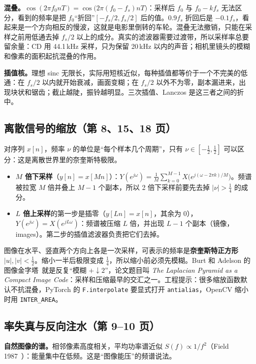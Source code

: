 \textbf{混叠。}$\cos(2\pi f_0nT)=\cos\big(2\pi(f_0-f_s)nT\big)$：采样后 $f_0$ 与 $f_0-kf_s$ 无法区分，看到的频率是把 $f_0$“折回”$[-f_s/2,f_s/2]$ 后的值。$0.9f_s$ 折回后是 $-0.1f_s$，看起来是一个方向相反的慢波，这就是电影里倒转的车轮。混叠无法撤销，只能在采样之前用低通去掉 $f_s/2$ 以上的成分。真实的滤波器需要过渡带，所以采样率总要留余量：CD 用 44.1\,kHz 采样，只为保留 20\,kHz 以内的声音；相机里镜头的模糊和像素的面积起抗混叠的作用。

\textbf{插值核。}理想 sinc 无限长，实际用短核近似，每种插值都等价于一个不完美的低通：在 $f_s/2$ 以内就开始衰减，画面变糊；在 $f_s/2$ 以外不为零，副本漏进来，出现块状和锯齿；截止越陡，振铃越明显。三次插值、Lanczos 是这三者之间的折中。

\subsection{离散信号的缩放（第 8、15、18 页）}\label{sec:resample}
对序列 $x[n]$，频率 $\nu$ 的单位是“每个样本几个周期”，只有 $\nu\in[-\tfrac12,\tfrac12]$ 可以区分：这是离散世界里的奈奎斯特极限。
\begin{itemize}
  \item \textbf{$M$ 倍下采样}（$y[n]=x[Mn]$）：$Y(e^{j\omega})=\frac1M\sum_{k=0}^{M-1}X\big(e^{j(\omega-2\pi k)/M}\big)$。频谱被拉宽 $M$ 倍并叠上 $M-1$ 个副本，所以 2 倍下采样前要先去掉 $|\nu|>\tfrac14$ 的成分。
  \item \textbf{$L$ 倍上采样}的第一步是插零（$y[Ln]=x[n]$，其余为 0），$Y(e^{j\omega})=X(e^{jL\omega})$：频谱被压缩 $L$ 倍，并出现 $L-1$ 个副本（镜像，images）。第二步的插值滤波器负责把它们去掉。
\end{itemize}
图像在水平、竖直两个方向上各是一次采样，可表示的频率是\textbf{奈奎斯特正方形} $|u|,|v|<\tfrac12$。缩小一半后极限变成 $\tfrac14$，所以缩小前必须先模糊。Burt 和 Adelson 的图像金字塔~\cite{burt1983}就是反复“模糊 $+\downarrow2$”，论文题目叫 \emph{The Laplacian Pyramid as a Compact Image Code}：采样和压缩最早的交汇之一。工程提示：很多缩放函数默认不抗混叠，PyTorch 的 \texttt{F.interpolate} 要显式打开 \texttt{antialias}，OpenCV 缩小时用 \texttt{INTER\_AREA}。

\subsection{率失真与反向注水（第 9--10 页）}\label{sec:rd}
\textbf{自然图像的谱。}相邻像素高度相关，平均功率谱近似 $S(f)\propto1/f^2$（Field 1987~\cite{field1987}）：能量集中在低频。这是“图像能压”的频谱说法。

